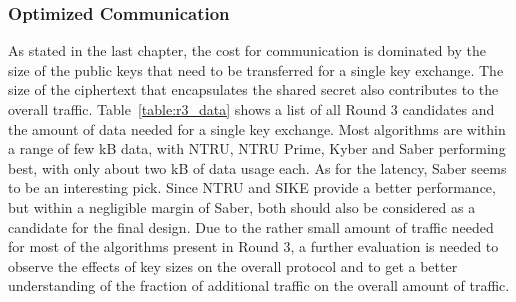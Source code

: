\subsubsection{Optimized Communication}

As stated in the last chapter, the cost for communication is dominated by the size of the public keys that need to be transferred for a single key exchange. The size of the ciphertext that encapsulates the shared secret also contributes to the overall traffic. Table~\ref{table:r3_data} shows a list of all Round 3 candidates and the amount of data needed for a single key exchange. Most algorithms are within a range of few kB data, with NTRU, NTRU Prime, Kyber and Saber performing best, with only about two kB of data usage each. As for the latency, Saber seems to be an interesting pick. Since NTRU and SIKE provide a better performance, but within a negligible margin of Saber, both should also be considered as a candidate for the final design. Due to the rather small amount of traffic needed for most of the algorithms present in Round 3, a further evaluation is needed to observe the effects of key sizes on the overall protocol and to get a better understanding of the fraction of additional traffic on the overall amount of traffic. 

